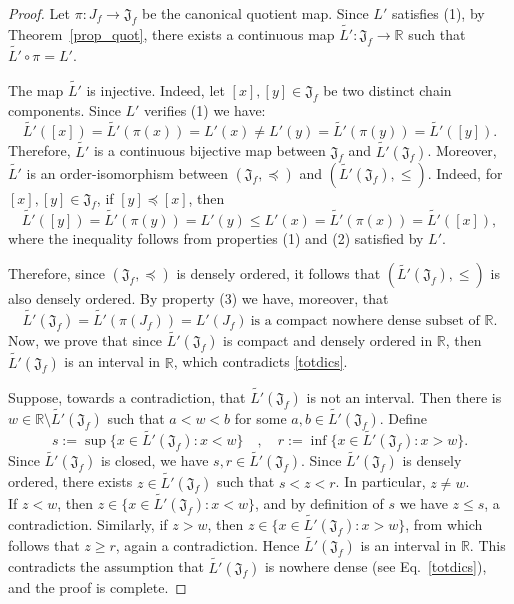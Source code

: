 \documentclass[pdflatex,sn-mathphys-num]{sn-jnl}
\theoremstyle{thmstyleone}%
\theoremstyle{thmstyletwo}%
\theoremstyle{thmstylethree}%
\begin{document}
\begin{proof}
    \noindent Let $\pi:J_f\to \mathfrak{J}_f$ be the canonical quotient map.
    Since $L'$ satisfies (1), by Theorem~\ref{prop_quot}, there exists a continuous map $\widetilde{L'}:\mathfrak{J}_f\to \mathbb{R}$ such that $\widetilde{L'}\circ\pi=L'$.
    
    \noindent The map $\widetilde{L'}$ is injective. Indeed, let $[x],[y]\in \mathfrak{J}_f$ be two distinct chain components.
    Since $L'$ verifies (1) we have:
    $$
    \widetilde{L'}([x])=\widetilde{L'}(\pi(x))=L'(x)\neq L'(y)=\widetilde{L'}(\pi(y))=\widetilde{L'}([y]).
    $$
    Therefore, $\widetilde{L'}$ is a continuous bijective map between $\mathfrak{J}_f$ and $\widetilde{L'}(\mathfrak{J}_f)$.
    Moreover, $\widetilde{L'}$ is an order-isomorphism between $(\mathfrak{J}_f,\preceq)$ and $(\widetilde{L'}(\mathfrak{J}_f),\le)$. Indeed, for $[x],[y]\in \mathfrak{J}_f$, if $[y]\preceq [x]$, then
$$
\widetilde{L'}([y])=\widetilde{L'}(\pi(y))=L'(y)\le L'(x)=\widetilde{L'}(\pi(x))=\widetilde{L'}([x]),
$$
where the inequality follows from properties (1) and (2) satisfied by $L'$.

\noindent Therefore, since $(\mathfrak{J}_f,\preceq)$ is densely ordered, it follows that $(\widetilde{L'}(\mathfrak{J}_f),\le)$ is also densely ordered. 
By property (3) we have, moreover,  that 
\begin{equation}
\label{totdics}
\widetilde{L'}(\mathfrak{J}_f)=\widetilde{L'}(\pi(J_f))=L'(J_f)\ \text{is a compact nowhere dense subset of $\mathbb{R}$}.
\end{equation}
\noindent Now, we prove that since $\widetilde{L'}(\mathfrak{J}_f)$ is compact and densely ordered in $\mathbb{R}$, then $\widetilde{L'}(\mathfrak{J}_f)$ is an interval in $\mathbb{R}$, which contradicts \eqref{totdics}.

\noindent Suppose, towards a contradiction, that $\widetilde{L'}(\mathfrak{J}_f)$ is not an interval.
Then there is $w\in\mathbb{R}\setminus \widetilde{L'}(\mathfrak{J}_f)$ such that $a<w<b$ for some $a,b\in \widetilde{L'}(\mathfrak{J}_f)$. 
Define 
$$
s:=\sup\{ x\in \widetilde{L'}(\mathfrak{J}_f) : x<w\}
\quad,\quad r:=\inf\{x\in \widetilde{L'}(\mathfrak{J}_f) : x>w\}.
$$
Since $\widetilde{L'}(\mathfrak{J}_f)$ is closed, we have $s,r\in \widetilde{L'}(\mathfrak{J}_f)$. 
Since $\widetilde{L'}(\mathfrak{J}_f)$ is densely ordered, there exists $z\in \widetilde{L'}(\mathfrak{J}_f)$ such that $s<z<r$. 
In particular, $z\neq w$.\\
If $z<w$, then $z\in \{x\in \widetilde{L'}(\mathfrak{J}_f) : x<w\}$, and by definition of $s$ we have $z\le s$, a contradiction. 
Similarly, if $z>w$, then $z\in \{x\in \widetilde{L'}(\mathfrak{J}_f) : x>w\}$, from which follows that $z\ge r$, again a contradiction.
Hence $\widetilde{L'}(\mathfrak{J}_f)$ is an interval in $\mathbb{R}$.
This contradicts the assumption that $\widetilde{L'}(\mathfrak{J}_f)$ is nowhere dense (see Eq.~\eqref{totdics}), and the proof is complete.  
\end{proof}
\end{document}
